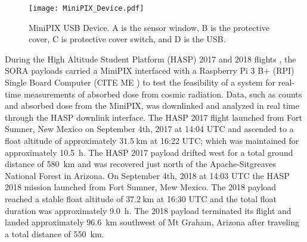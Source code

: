 \begin{figure}[H] %
    \centering
    \texttt{[image: MiniPIX\_Device.pdf]} 
    \caption{MiniPIX USB Device. A is the sensor window, B is the protective cover, C is protective cover switch, and D is the USB.}
    \label{fig:minipix_usb}
\end{figure}

During the High Altitude Student Platform (HASP) 2017 and 2018 flights \cite{hasp}, the SORA payloads carried a MiniPIX interfaced with a Raspberry Pi 3 B+ (RPI) Single Board Computer (CITE ME%
) to test the feasibility of a system for real-time measurements of absorbed dose from cosmic radiation. Data, such as counts and absorbed dose from the MiniPIX, was downlinked and analyzed in real time through the HASP downlink interface. The HASP 2017 flight launched from Fort Sumner, New Mexico on September 4th, 2017 at 14:04 UTC and ascended to a float altitude of approximately $\SI{31.5}{\kilo\meter}$ at 16:22 UTC; which was maintained for approximately \SI{10.5}{\hour}. The HASP 2017 payload drifted west for a total ground distance of \SI{580}{\kilo\meter} and was recovered just north of the Apache-Sitgreaves National Forest in Arizona.  On September 4th, 2018 at 14:03 UTC the HASP 2018 mission launched from Fort Sumner, Mew Mexico.  The 2018 payload reached a stable float altitude of $\SI{37.2}{\kilo\meter}$ at 16:30 UTC and the total float duration was approximately \SI{9.0}{\hour}. The 2018 payload terminated its flight and landed approximately \SI{96.6}{\kilo\meter} southwest of Mt Graham, Arizona after traveling a total distance of \SI{550}{\kilo\meter}.

